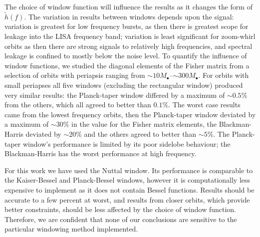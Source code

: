 \documentclass[useAMS,usedcolumn,usegraphicx,usenatbib]{mn2e}
\begin{document}
The choice of window function will influence the results as it changes the form of $\widetilde{h}(f)$. The variation in results between windows depends upon the signal: variation is greatest for low frequency bursts, as then there is greatest scope for leakage into the LISA frequency band; variation is least significant for zoom-whirl orbits as then there are strong signals to relatively high frequencies, and spectral leakage is confined to mostly below the noise level. To quantify the influence of window functions, we studied the diagonal elements of the Fisher matrix from a selection of orbits with periapsis ranging from $\sim 10 M_\bullet$--$\sim 300 M_\bullet$. For orbits with small periapses all five windows (excluding the rectangular window) produced very similar results: the Planck-taper window differed by a maximum of $\sim 0.5 \%$ from the others, which all agreed to better than $0.1 \%$. The worst case results came from the lowest frequency orbits, then the Planck-taper window deviated by a maximum of $\sim 30 \%$ in the value for the Fisher matrix elements, the Blackman-Harris deviated by $\sim 20 \%$ and the others agreed to better than $\sim 5 \%$. The Planck-taper window's performance is limited by its poor sidelobe behaviour; the Blackman-Harris has the worst performance at high frequency.

For this work we have used the Nuttal window. Its performance is comparable to the Kaiser-Bessel and Planck-Bessel windows, however it is computationally less expensive to implement as it does not contain Bessel functions. Results should be accurate to a few percent at worst, and results from closer orbits, which provide better constraints, should be less affected by the choice of window function. Therefore, we are confident that none of our conclusions are sensitive to the particular windowing method implemented.

\bsp

\label{lastpage}
\end{document}
